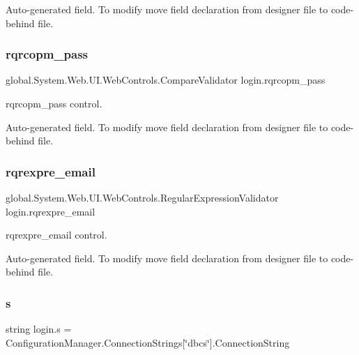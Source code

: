 Auto-\/generated field. To modify move field declaration from designer file to code-\/behind file. \mbox{\label{classlogin_a639af5216828efa3292806bfaa3c140f}} 
\subsubsection{\texorpdfstring{rqrcopm\_pass}{rqrcopm\_pass}}
{\footnotesize\ttfamily global.\+System.\+Web.\+U\+I.\+Web\+Controls.\+Compare\+Validator login.\+rqrcopm\+\_\+pass\hspace{0.3cm}{\ttfamily [protected]}}



rqrcopm\+\_\+pass control. 

Auto-\/generated field. To modify move field declaration from designer file to code-\/behind file. \mbox{\label{classlogin_ad92ee8bc0cc1d5af17435422a7509b39}} 
\subsubsection{\texorpdfstring{rqrexpre\_email}{rqrexpre\_email}}
{\footnotesize\ttfamily global.\+System.\+Web.\+U\+I.\+Web\+Controls.\+Regular\+Expression\+Validator login.\+rqrexpre\+\_\+email\hspace{0.3cm}{\ttfamily [protected]}}



rqrexpre\+\_\+email control. 

Auto-\/generated field. To modify move field declaration from designer file to code-\/behind file. \mbox{\label{classlogin_a75f80599c75c0bf309dd1d3cf87c6e6e}} 
\subsubsection{\texorpdfstring{s}{s}}
{\footnotesize\ttfamily string login.\+s = Configuration\+Manager.\+Connection\+Strings\mbox{[}\char`\"{}dbcs\char`\"{}\mbox{]}.Connection\+String\hspace{0.3cm}{\ttfamily [private]}}

\mbox{\label{classlogin_a4b11713f4e024290de823dd5792dd7c1}} 
